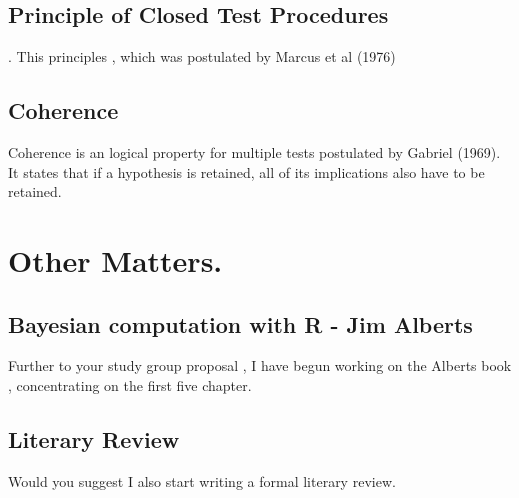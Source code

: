 \documentclass{article}
\begin{document}
\subsection*{Principle of Closed Test Procedures}.
This principles , which was postulated by Marcus et al (1976)

\subsection*{Coherence}
Coherence is an logical property for multiple tests postulated by
Gabriel (1969). It states that if a hypothesis is retained, all of
its implications also have to be retained.

\section*{Other Matters.}
\subsection*{Bayesian computation with R - Jim Alberts}
Further to your study group proposal , I have begun working on the
Alberts book , concentrating on the first five chapter.

\subsection*{Literary Review}
Would you suggest I also start writing a formal literary review.
\end{document}
